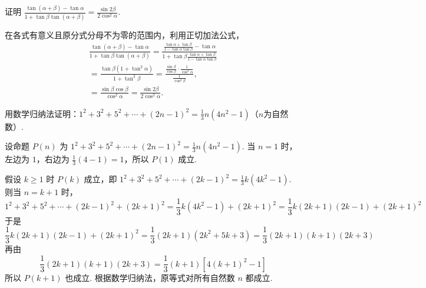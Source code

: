 \documentclass[UTF8,a4paper,oneside,11pt]{ctexbook}
\begin{document}
\begin{problem}

证明 \(\frac{\tan(\alpha + \beta) - \tan\alpha}{1 + \tan\beta\tan(\alpha + \beta)} = \frac{\sin 2\beta}{2\cos^2\alpha}\).

\begin{solution}
在各式有意义且原分式分母不为零的范围内，利用正切加法公式，
\[
\begin{gathered}
\frac{\tan(\alpha + \beta) - \tan\alpha}{1 + \tan\beta\tan(\alpha + \beta)}
= \frac{\frac{\tan\alpha+\tan\beta}{1-\tan\alpha\tan\beta}-\tan\alpha}{1+\tan\beta\frac{\tan\alpha+\tan\beta}{1-\tan\alpha\tan\beta}}\\
= \frac{\tan\beta(1+\tan^{2}\alpha)}{1+\tan^{2}\beta}
= \frac{\frac{\sin\beta}{\cos\beta}\cdot\frac{1}{\cos^{2}\alpha}}{\frac{1}{\cos^{2}\beta}},\\
= \frac{\sin\beta\cos\beta}{\cos^{2}\alpha}
= \frac{\sin 2\beta}{2\cos^{2}\alpha}.
\end{gathered}
\]
\end{solution}
\end{problem}

\begin{problem}

用数学归纳法证明：\(1^{2}+3^{2}+5^{2}+\cdots+(2n-1)^{2}=\frac{1}{3}n(4n^{2}-1)\)（\(n\)为自然数）.

\begin{solution}
设命题 \(P(n)\) 为 \(1^{2}+3^{2}+5^{2}+\cdots+(2n-1)^{2}=\frac13n(4n^{2}-1)\). 当 \(n=1\) 时，左边为 \(1\)，右边为 \(\frac13(4-1)=1\)，所以 \(P(1)\) 成立.

假设 \(k\geqslant1\) 时 \(P(k)\) 成立，即
\(1^{2}+3^{2}+5^{2}+\cdots+(2k-1)^{2}=\frac13k(4k^{2}-1)\). 则当 \(n=k+1\) 时，
\[
1^{2}+3^{2}+5^{2}+\cdots+(2k-1)^{2}+(2k+1)^{2}
= \frac13k(4k^{2}-1)+(2k+1)^{2}
= \frac13k(2k+1)(2k-1)+(2k+1)^{2}
\]
于是
\[
\frac13k(2k+1)(2k-1)+(2k+1)^{2}
= \frac13(2k+1)(2k^{2}+5k+3)
= \frac13(2k+1)(k+1)(2k+3)
\]
再由
\[
\frac13(2k+1)(k+1)(2k+3)
= \frac13(k+1)\left[4(k+1)^{2}-1\right]
\]
所以 \(P(k+1)\) 也成立. 根据数学归纳法，原等式对所有自然数 \(n\) 都成立.
\end{solution}
\end{problem}
\end{document}
